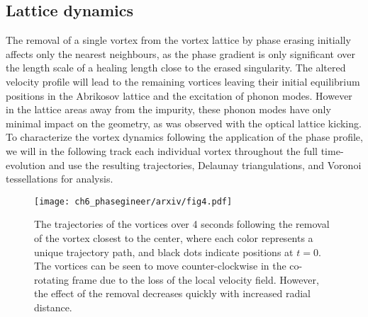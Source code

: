 \subsection{Lattice dynamics}


The removal of a single vortex from the vortex lattice by phase erasing initially affects only the nearest neighbours, as the phase gradient is only significant over the length scale of a healing length close to the erased singularity. The altered velocity profile will lead to the remaining vortices leaving their initial equilibrium positions in the Abrikosov lattice and the excitation of phonon modes. However in the lattice areas away from the impurity, these phonon modes have only minimal impact on the geometry, as was observed with the optical lattice kicking. To characterize the vortex dynamics following the application of the phase profile, we will in the following track each individual vortex throughout the full time-evolution and use the resulting trajectories, Delaunay triangulations, and Voronoi tessellations for analysis.

\begin{figure}\centering
\texttt{[image: ch6\_phasegineer/arxiv/fig4.pdf]}
    \caption{The trajectories of the vortices over 4 seconds following the removal of the vortex closest to the center, where each color represents a unique trajectory path, and black dots indicate positions at $t=0$. The vortices can be seen to move counter-clockwise in the co-rotating frame due to the loss of the local velocity field. However, the effect of the removal decreases quickly with increased radial distance. }
    \label{fig:trajplot}
\end{figure}


